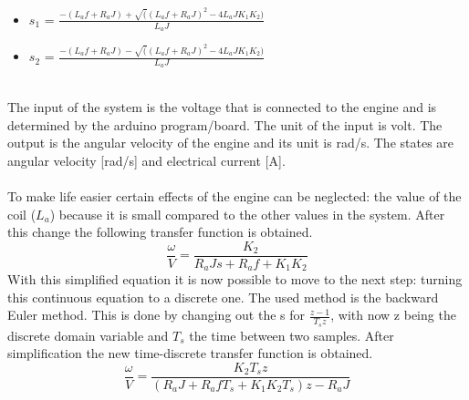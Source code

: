 \begin{itemize}
\label{it:polen van het systeem}
    \item $s_{1}$ = $\frac{-(L_{a}f+R_{a}J) + \sqrt((L_{a}f+R_{a}J)^2-4L_{a}JK_{1}K_{2})}{L_{a}J}$
    \item $s_{2}$ = $\frac{-(L_{a}f+R_{a}J) - \sqrt((L_{a}f+R_{a}J)^2-4L_{a}JK_{1}K_{2})}{L_{a}J}$
\end{itemize}

\\
The input of the system is the voltage that is connected to the engine and is determined by the arduino program/board. The unit of the input is volt. The output is the angular velocity of the engine and its unit is rad/s. The states are angular velocity [rad/s] and electrical current [A].\\
\\
To make life easier certain effects of the engine can be neglected: the value of the coil ($L_{a}$) because it is small compared to the other values in the system. After this change the following transfer function is obtained.\cite{handboek}
\begin{equation}
\label{eq:transferfunctie eenvoudig}
    \frac{\omega}{V} = \frac{K_{2}}{R_{a}Js+R_{a}f+K_{1}K_{2}}
\end{equation}
With this simplified equation it is now possible to move to the next step: turning this continuous equation to a discrete one. The used method is the backward Euler method.  This is done by changing out the s for $\tfrac{z-1}{T_{s}z}$, with now z being the discrete domain variable and $T_{s}$ the time between two samples. After simplification the new time-discrete transfer function is obtained.
\begin{equation}
\label{eq:transferfunctie discreet}
    \frac{\omega}{V} = \frac{K_{2}T_{s}z}{(R_{a}J+R_{a}fT_{s}+K_{1}K_{2}T_{s})z-R_{a}J}
\end{equation}
